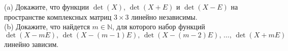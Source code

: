 \documentclass{article}
\begin{document}
(a) Докажите, что функции $\det (X)$, $\det (X+E)$ и $\det (X-E)$ на пространстве комплексных матриц $3 \times 3$ линейно независимы.\\
(b) Докажите, что найдется $m \in \mathbb{N}$, для которого набор функций
$$\det (X-mE),\, \det (X-(m-1)E),\, \det (X-(m-2)E),\, \ldots,\, \det (X+mE)$$
линейно зависим.
\end{document}
